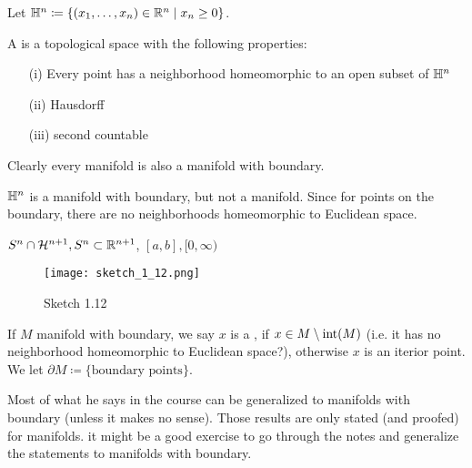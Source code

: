 Let \(\mathbb{H}^n\coloneqq \{(x_1,\dots,x_n)\in\mathbb{R}^n\mid x_n\geq 0\}\).
\begin{definition*}
    A  is a topological space with the following properties:
    \begin{enumerate}
        \item[(i)] Every point has a neighborhood homeomorphic to an open subset of \(\mathbb{H}^n\)
        \item[(ii)] Hausdorff
        \item[(iii)] second countable   
    \end{enumerate}
\end{definition*}

Clearly every manifold is also a manifold with boundary.

\begin{example}
    \(\mathbb{H}^n\) is a manifold with boundary, but not a manifold. Since for points on the boundary, there are no neighborhoods homeomorphic to Euclidean space.
\end{example}

\begin{example}
    \(S^n\cap \mathcal{H}^{n+1},S^n\subset\mathbb{R}^{n+1}\), \([a,b],[0,\infty)\)
    \begin{figure}[H]
        \centering
        \texttt{[image: sketch\_1\_12.png]}
        \caption{Sketch 1.12}
    \end{figure}
\end{example}

\begin{definition*}
    If \(M\) manifold with boundary, we say \(x\) is a , if \(x\in M\setminus\text{int}(M)\) (i.e. it has no neighborhood homeomorphic to Euclidean space?), otherwise \(x\) is an iterior point. We let \(\partial M \coloneqq \{\text{boundary points}\}\).
\end{definition*}



\begin{remark}
    Most of what he says in the course can be generalized to manifolds with boundary (unless it makes no sense).
    Those results are only stated (and proofed) for manifolds. it might be a good exercise to go through the notes and generalize the statements to manifolds with boundary.
\end{remark}

